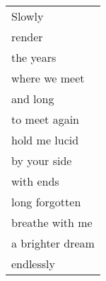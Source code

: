 \documentclass{article}
\begin{document}
\begin{center}
\begin{tabular}{l}
\\
Slowly \\
render \\
the years \\
where we meet \\
and long \\
to meet again \\
hold me lucid \\
by your side \\
with ends \\
long forgotten \\
breathe with me \\
a brighter dream \\
endlessly \\
\end{tabular}
\end{center}
\end{document}
